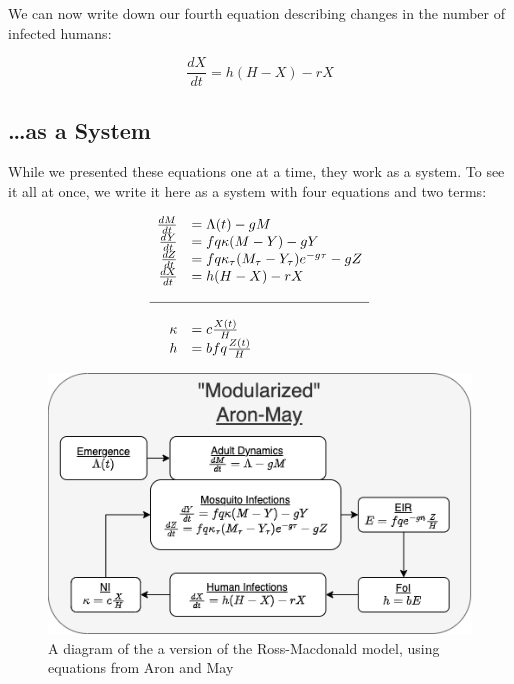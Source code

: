 \documentclass[
]{book}
\begin{document}
We can now write down our fourth equation describing changes in the number of infected humans:

\begin{equation}
\frac{dX}{dt} = h (H-X) - r X 
\end{equation}

\subsection{\ldots as a System}\label{as-a-system}

While we presented these equations one at a time, they work as a system. To see it all at once, we write it here as a system with four equations and two terms:

\begin{equation}
\begin{array}{rl}
\frac{dM}{dt} &= \Lambda(t) - g M \\
\frac{dY}{dt} &= fq\kappa(M-Y) - g Y \\
\frac{dZ}{dt} &= fq\kappa_\tau(M_\tau-Y_\tau)e^{-g\tau} - g Z \\
\frac{dX}{dt} &= h (H-X) - rX  \\ \\ \hline \\ 
\kappa &= c \frac{X(t)}{H} \\
h &= b fq \frac{Z(t)}{H} \\
\end{array}
\end{equation}

\begin{figure}
\centering
\includegraphics{Figures/AronMay.png}
\caption{A diagram of the a version of the Ross-Macdonald model, using equations from Aron and May \autocite{AronJL1982PopulationDynamics}}
\end{figure}
\end{document}
